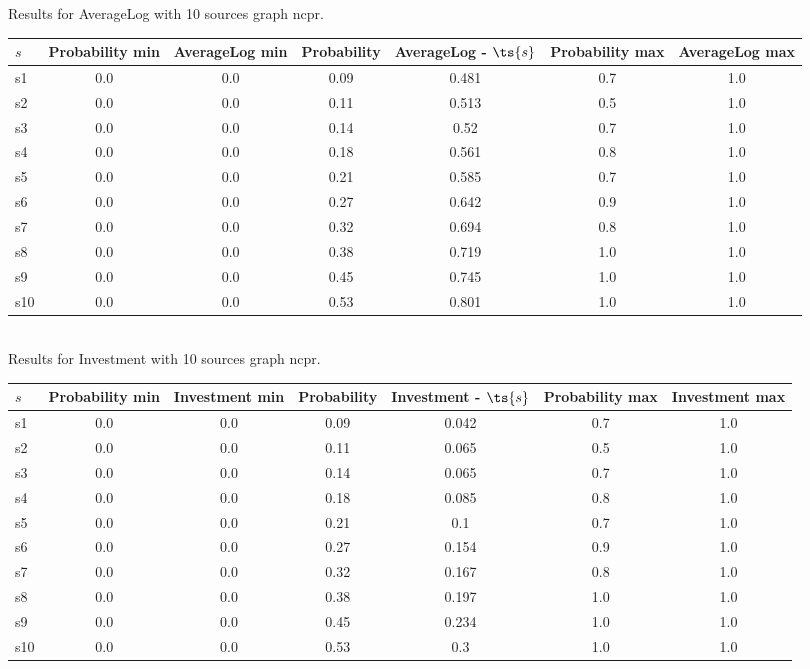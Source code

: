\documentclass{article}
\begin{document}
\noindent Results for AverageLog with 10 sources graph ncpr.

\noindent\begin{tabular}{|l|c|c|c|c|c|c|}
\hline
$s$& Probability min & AverageLog min & Probability & AverageLog - $\ts{s}$ & Probability max & AverageLog max\\
\hline
s1 &0.0 & 0.0 & 0.09 & 0.481 & 0.7 & 1.0\\
\hline
s2 &0.0 & 0.0 & 0.11 & 0.513 & 0.5 & 1.0\\
\hline
s3 &0.0 & 0.0 & 0.14 & 0.52 & 0.7 & 1.0\\
\hline
s4 &0.0 & 0.0 & 0.18 & 0.561 & 0.8 & 1.0\\
\hline
s5 &0.0 & 0.0 & 0.21 & 0.585 & 0.7 & 1.0\\
\hline
s6 &0.0 & 0.0 & 0.27 & 0.642 & 0.9 & 1.0\\
\hline
s7 &0.0 & 0.0 & 0.32 & 0.694 & 0.8 & 1.0\\
\hline
s8 &0.0 & 0.0 & 0.38 & 0.719 & 1.0 & 1.0\\
\hline
s9 &0.0 & 0.0 & 0.45 & 0.745 & 1.0 & 1.0\\
\hline
s10 &0.0 & 0.0 & 0.53 & 0.801 & 1.0 & 1.0\\
\hline
\end{tabular}\\

\noindent Results for Investment with 10 sources graph ncpr.

\noindent\begin{tabular}{|l|c|c|c|c|c|c|}
\hline
$s$& Probability min & Investment min & Probability & Investment - $\ts{s}$ & Probability max & Investment max\\
\hline
s1 &0.0 & 0.0 & 0.09 & 0.042 & 0.7 & 1.0\\
\hline
s2 &0.0 & 0.0 & 0.11 & 0.065 & 0.5 & 1.0\\
\hline
s3 &0.0 & 0.0 & 0.14 & 0.065 & 0.7 & 1.0\\
\hline
s4 &0.0 & 0.0 & 0.18 & 0.085 & 0.8 & 1.0\\
\hline
s5 &0.0 & 0.0 & 0.21 & 0.1 & 0.7 & 1.0\\
\hline
s6 &0.0 & 0.0 & 0.27 & 0.154 & 0.9 & 1.0\\
\hline
s7 &0.0 & 0.0 & 0.32 & 0.167 & 0.8 & 1.0\\
\hline
s8 &0.0 & 0.0 & 0.38 & 0.197 & 1.0 & 1.0\\
\hline
s9 &0.0 & 0.0 & 0.45 & 0.234 & 1.0 & 1.0\\
\hline
s10 &0.0 & 0.0 & 0.53 & 0.3 & 1.0 & 1.0\\
\hline
\end{tabular}\\
\end{document}
